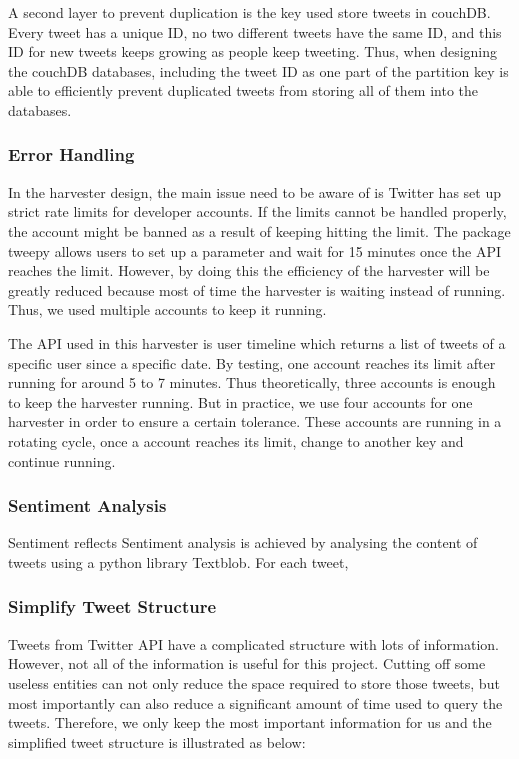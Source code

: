 A second layer to prevent duplication is the key used store tweets in couchDB. Every tweet has a unique ID, no two different tweets have the same ID, and this ID for new tweets keeps growing as people keep tweeting. Thus, when designing the couchDB databases, including the tweet ID as one part of the partition key is able to efficiently prevent duplicated tweets from storing all of them into the databases.
\subsubsection{Error Handling}
In the harvester design, the main issue need to be aware of is Twitter has set up strict rate limits for developer accounts. If the limits cannot be handled properly, the account might be banned as a result of keeping hitting the limit.
The package tweepy allows users to set up a parameter and wait for 15 minutes once the API reaches the limit. However, by doing this the efficiency of the harvester will be greatly reduced because most of time the harvester is waiting instead of running. Thus, we used multiple accounts to keep it running.

The API used in this harvester is user timeline which returns a list of tweets of a specific user since a specific date. By testing, one account reaches its limit after running for around 5 to 7 minutes. Thus theoretically, three accounts is enough to keep the harvester running. But in practice, we use four accounts for one harvester in order to ensure a certain tolerance. These accounts are running in a rotating cycle, once a account reaches its limit, change to another key and continue running.

\subsubsection{Sentiment Analysis}
Sentiment reflects Sentiment analysis is achieved by analysing the content of tweets using a python library Textblob. For each tweet, 
\subsubsection{Simplify Tweet Structure}
Tweets from Twitter API have a complicated structure with lots of information. However, not all of the information is useful for this project. Cutting off some useless entities can not only reduce the space required to store those tweets, but most importantly can also reduce a significant amount of time used to query the tweets. Therefore, we only keep the most important information for us and the simplified tweet structure is illustrated as below:

